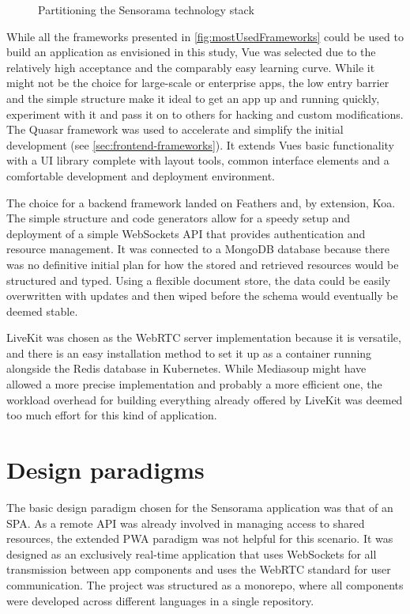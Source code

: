 \begin{figure}[!ht]
\centering

\caption[Sensorama stack diagram]{Partitioning the Sensorama technology stack\protect}
\label{fig:sensoramaStack}
\end{figure}

While all the frameworks presented in \autoref{fig:mostUsedFrameworks} could be used to build an application as envisioned in this study, Vue was selected due to the relatively high acceptance and the comparably easy learning curve.
While it might not be the choice for large-scale or enterprise apps, the low entry barrier and the simple structure make it ideal to get an app up and running quickly, experiment with it and pass it on to others for hacking and custom modifications.
The Quasar framework was used to accelerate and simplify the initial development (see \autoref{sec:frontend-frameworks}).
It extends Vue\textquotesingle s basic functionality with a \ac{UI} library complete with layout tools, common interface elements and a comfortable development and deployment environment.

The choice for a backend framework landed on Feathers and, by extension, Koa.
The simple structure and code generators allow for a speedy setup and deployment of a simple WebSockets \ac{API} that provides authentication and resource management.
It was connected to a MongoDB database because there was no definitive initial plan for how the stored and retrieved resources would be structured and typed.
Using a flexible document store, the data could be easily overwritten with updates and then wiped before the schema would eventually be deemed stable.

LiveKit was chosen as the WebRTC server implementation because it is versatile, and there is an easy installation method to set it up as a container running alongside the Redis database in Kubernetes.
While Mediasoup might have allowed a more precise implementation and probably a more efficient one, the workload overhead for building everything already offered by LiveKit was deemed too much effort for this kind of application.

\section{Design paradigms}
\label{sec:design-paradigms}

The basic design paradigm chosen for the Sensorama application was that of an \ac{SPA}.
As a remote API was already involved in managing access to shared resources, the extended \ac{PWA} paradigm was not helpful for this scenario.
It was designed as an exclusively real-time application that uses WebSockets for all transmission between app components and uses the WebRTC standard for user communication.
The project was structured as a monorepo, where all components were developed across different languages in a single repository.

